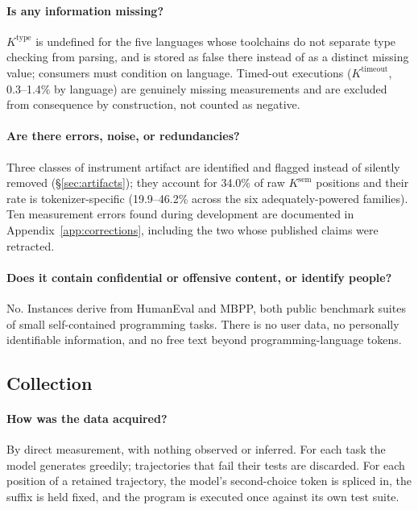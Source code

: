 \paragraph{Is any information missing?} $K^{\mathrm{type}}$ is undefined for the five languages whose
toolchains do not separate type checking from parsing, and is stored as false there instead of as a
distinct missing value; consumers must condition on language. Timed-out executions
($K^{\mathrm{timeout}}$, 0.3--1.4\% by language) are genuinely missing measurements and are excluded
from consequence by construction, not counted as negative.

\paragraph{Are there errors, noise, or redundancies?} Three classes of instrument artifact are
identified and flagged instead of silently removed (\S\ref{sec:artifacts}); they account for
34.0\% of raw $K^{\mathrm{sem}}$ positions and their rate is tokenizer-specific
(19.9--46.2\% across the six adequately-powered families). Ten measurement errors found during development are documented in
Appendix~\ref{app:corrections}, including the two whose published claims were retracted.

\paragraph{Does it contain confidential or offensive content, or identify people?} No. Instances
derive from HumanEval and MBPP, both public benchmark suites of small self-contained programming
tasks. There is no user data, no personally identifiable information, and no free text beyond
programming-language tokens.

\subsection*{Collection}

\paragraph{How was the data acquired?} By direct measurement, with nothing observed or inferred.
For each task the model generates greedily; trajectories that fail their tests are discarded. For
each position of a retained trajectory, the model's second-choice token is spliced in, the suffix is
held fixed, and the program is executed once against its own test suite.

